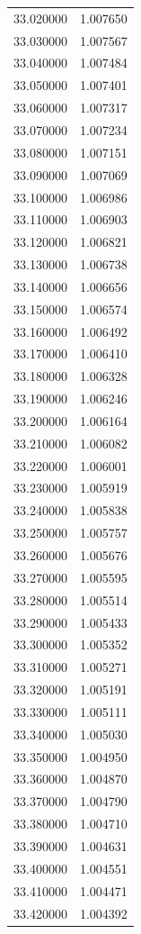 \begin{tabular}{rr}
33.020000 & 1.007650 \\
33.030000 & 1.007567 \\
33.040000 & 1.007484 \\
33.050000 & 1.007401 \\
33.060000 & 1.007317 \\
33.070000 & 1.007234 \\
33.080000 & 1.007151 \\
33.090000 & 1.007069 \\
33.100000 & 1.006986 \\
33.110000 & 1.006903 \\
33.120000 & 1.006821 \\
33.130000 & 1.006738 \\
33.140000 & 1.006656 \\
33.150000 & 1.006574 \\
33.160000 & 1.006492 \\
33.170000 & 1.006410 \\
33.180000 & 1.006328 \\
33.190000 & 1.006246 \\
33.200000 & 1.006164 \\
33.210000 & 1.006082 \\
33.220000 & 1.006001 \\
33.230000 & 1.005919 \\
33.240000 & 1.005838 \\
33.250000 & 1.005757 \\
33.260000 & 1.005676 \\
33.270000 & 1.005595 \\
33.280000 & 1.005514 \\
33.290000 & 1.005433 \\
33.300000 & 1.005352 \\
33.310000 & 1.005271 \\
33.320000 & 1.005191 \\
33.330000 & 1.005111 \\
33.340000 & 1.005030 \\
33.350000 & 1.004950 \\
33.360000 & 1.004870 \\
33.370000 & 1.004790 \\
33.380000 & 1.004710 \\
33.390000 & 1.004631 \\
33.400000 & 1.004551 \\
33.410000 & 1.004471 \\
33.420000 & 1.004392 \\

\end{tabular}
